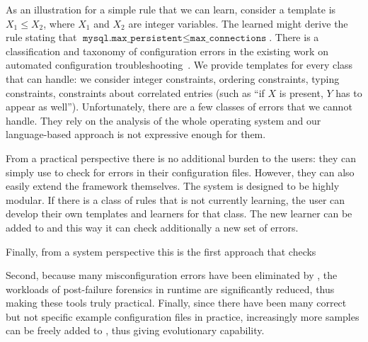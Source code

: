 As an 
illustration for a simple rule that we can learn, consider a template is $X_1 \le X_2$, where $X_1$ and $X_2$ are
integer variables. The learned might derive the rule stating that
$\texttt{mysql.max\_persistent} \le \texttt{max\_connections}$. There is a classification and taxonomy of configuration errors in the 
existing work on automated configuration troubleshooting~\cite{yin11anempirical, configdataset}. We provide templates for every class that \app can handle: we consider integer constraints, ordering
constraints, typing constraints, constraints about correlated entries (such as ``if $X$ is present, $Y$ has to appear as well''). Unfortunately, there are a few classes of errors that we cannot handle. They
 rely on the analysis of the whole operating system and our language-based
approach is not expressive enough for them. 

From a  practical perspective there is no additional burden 
to the users: they can simply use \app to check for errors in their configuration files. However, they can also easily extend the framework themselves. The system is designed to be highly modular. If there is a class of rules that \app is not currently learning, the user can develop their own templates and learners for that class. The new learner can be added to \app and this way it can check additionally a new set of errors.

Finally, from a system perspective this is the first approach that checks 



Second, because many misconfiguration errors have been eliminated 
by \app, the workloads of post-failure forensics in runtime
are significantly reduced, thus making these tools truly practical.
Finally, since there have been many correct but not specific 
example configuration files in practice, 
increasingly more samples can be freely added to \app,
thus giving \app evolutionary capability.


